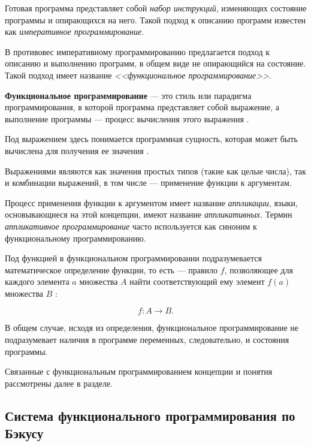 Готовая программа представляет собой \textit{набор инструкций}, изменяющих
состояние программы и опирающихся на него. Такой подход к описанию программ 
известен как \textit{императивное программирование}.

В противовес императивному программированию предлагается подход к описанию
и выполнению программ, в общем виде не опирающийся на состояние. Такой подход
имеет название \textit{<<функциональное программирование>>}.

\textbf{Функциональное программирование} --- это стиль или парадигма
программирования, в которой программа представляет собой выражение, а
выполнение программы --- процесс вычисления этого выражения \cite{harrison97}. %

Под выражением здесь понимается программная сущность, которая
может быть вычислена для получения ее значения \cite[с.~26]{sicp}. %

Выражениями являются как значения простых типов (такие как целые числа),
так и комбинации выражений, в том числе --- применение функции к аргументам.

Процесс применения функции к аргументом имеет название \textit{аппликации}, языки,
основывающиеся на этой концепции, имеют название \textit{аппликативных}. Термин
\textit{аппликативное программирование} часто используется как синоним к функциональному
программированию.

Под функцией в функциональном программировании подразумевается математическое определение функции, 
то есть --- правило $f$, позволяющее для каждого элемента $a$ множества $A$ найти соответствующий 
ему элемент $f(a)$ множества $B$ \cite[с.~12]{algrebrakirkinskii}: %

\begin{equation}
    \label{eq:function_equation}
    f : A \rightarrow B.
\end{equation}

В общем случае, исходя из определения, функциональное программирование 
не подразумевает наличия в программе переменных, следовательно, и состояния 
программы.

Связанные с функциональным программированием концепции и понятия рассмотрены
далее в разделе.

\subsection{Система функционального программирования по Бэкусу}\label{sec:ch1/sec3/subsec1}

